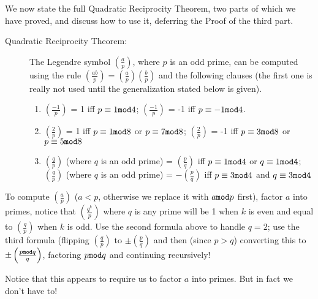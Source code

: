 \documentclass[12pt]{article}
\begin{document}
We now state the full Quadratic Reciprocity Theorem, two parts of which we have proved, and discuss how to use it, deferring the Proof of the third part.

\begin{description}

\item[Quadratic Reciprocity Theorem:]   The Legendre symbol $\left(\frac ap\right)$, where $p$ is an odd prime,  can be computed using the rule $\left(\frac{ab}p\right) = \left(\frac ap\right)\left(\frac bp\right)$ and the following clauses
(the first one is really not used until the generalization stated below is given). 

\begin{enumerate}

\item  $\left(\frac{-1}p\right)$ = 1 iff $p \equiv1{\tt mod}4$; $\left(\frac{-1}p\right)$ = -1 iff $p \equiv-1{\tt mod}4$.

\item   $\left(\frac{2}p\right)$ = 1 iff $p \equiv 1{\tt mod}8$ or  $p \equiv 7{\tt mod}8$;   $\left(\frac{2}p\right)$ = -1 iff $p \equiv 3{\tt mod}8$ or  $p \equiv 5{\tt mod}8$

\item  $\left(\frac qp\right)$ (where $q$ is an odd prime) = $\left(\frac pq\right)$ iff $p \equiv 1{\tt mod}4$ or $q \equiv 1{\tt mod 4}$;    $\left(\frac qp\right)$ (where $q$ is an odd prime) = $-\left(\frac pq\right)$ iff $p \equiv 3{\tt mod}4$ and $q \equiv 3{\tt mod 4}$

\end{enumerate}

\end{description}

To compute $\left(\frac ap\right)$ ($a<p$, otherwise we replace it with $a{\tt mod}p$ first), factor $a$ into primes, notice that $\left(\frac{q^k}p\right)$ where $q$ is any prime will be 1 when $k$ is even and equal to $\left(\frac{q}p\right)$  when $k$ is odd.   Use the second formula
above to handle $q=2$; use the third formula (flipping $\left(\frac qp\right)$ to $\pm \left(\frac pq\right)$ and then (since $p>q$) converting this to $\pm \left(\frac{p{\tt mod}q}q\right)$, factoring $p {\tt mod}q$ and continuing recursively!

Notice that this appears to require us to factor $a$ into primes.   But in fact we don't have to!
\end{document}
